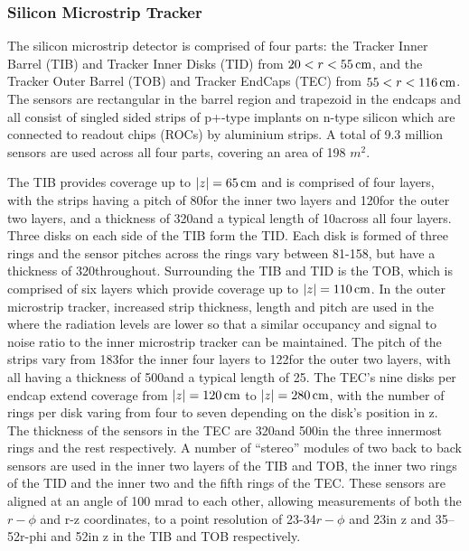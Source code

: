 \subsubsection{Silicon Microstrip Tracker}
The silicon microstrip detector is comprised of four parts: the Tracker Inner Barrel (TIB) and Tracker Inner Disks (TID) from $20 < r < 55\,\text{cm}$, and the Tracker Outer Barrel (TOB) and Tracker EndCaps (TEC) from $55 < r < 116\,\text{cm}$.
The sensors are rectangular in the barrel region and trapezoid in the endcaps and all consist of singled sided strips of p+-type implants on n-type silicon which are connected to readout chips (ROCs) by aluminium strips.
A total of 9.3 million sensors are used across all four parts, covering an area of 198 $\unit{m}^{2}$.

The TIB provides coverage up to $|z| = 65\,\text{cm}$ and is comprised of four layers, with the strips having a pitch of 80\mum for the inner two layers and 120\mum for the outer two layers, and a thickness of 320\mum and a typical length of 10\cm across all four layers.
Three disks on each side of the TIB form the TID. 
Each disk is formed of three rings and the sensor pitches across the rings vary between 81-158\mum, but have a thickness of 320\mum throughout.
Surrounding the TIB and TID is the TOB,	which is comprised of six layers which provide coverage up to $|z| = 110\,\text{cm}$.
In the outer microstrip tracker, increased strip thickness, length and pitch are used in the where the radiation levels are lower so that a similar occupancy and signal to noise ratio to the inner microstrip tracker can be maintained.
The pitch of the strips vary from 183\mum for the inner four layers to 122\mum for the outer two layers, with all having a thickness of 500\mum and a typical length of 25\cm. 
The TEC's nine disks per endcap extend coverage from $|z| = 120\,\text{cm}$ to $|z| = 280\,\text{cm}$, with the number of rings per disk varing from four to seven depending on the disk's position in z.
The thickness of the sensors in the TEC are 320\mum and 500\mum in the three innermost rings and the rest respectively.
A number of ``stereo'' modules of two back to back sensors are used in the inner two layers of the TIB and TOB, the inner two rings of the TID and the inner two and the fifth rings of the TEC.
These sensors are aligned at an angle of 100 mrad to each other, allowing measurements of both the $r-\phi$ and r-z coordinates, to a point resolution of 23-34\mum $r-\phi$ and 23\mum in z and 35–52\mum r-phi and 52\mum in z in the TIB and TOB respectively.


